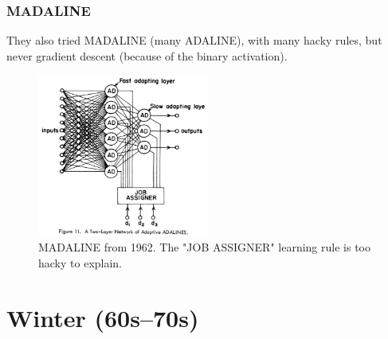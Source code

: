 \documentclass{beamer}
\begin{document}
\begin{frame}
\frametitle{MADALINE}
They also tried MADALINE (many ADALINE), with many hacky rules, but never gradient descent (because of the binary activation).

\begin{figure}[t]
    \includegraphics[width=0.5\textwidth]{figure/MADALINE.png}
    \centering
    \caption{MADALINE from 1962. The "JOB ASSIGNER" learning rule is too hacky to explain. \cite{widrowGeneralizationInformationStorage1962}}
\end{figure}
\end{frame}

\section{Winter (60s--70s)}
\end{document}
